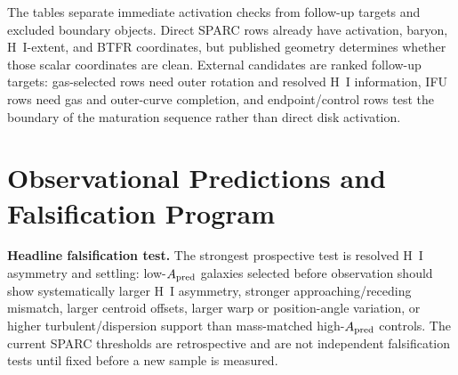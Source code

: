 \documentclass[11pt]{article}
\begin{document}
\begin{table}[H]
\centering
\scriptsize
\caption{Top low-activation follow-up candidates and juvenile-forming contrasts.}
\end{table}

The tables separate immediate activation checks from follow-up targets and excluded boundary objects. Direct SPARC rows already have activation, baryon, H~I-extent, and BTFR coordinates, but published geometry determines whether those scalar coordinates are clean. External candidates are ranked follow-up targets: gas-selected rows need outer rotation and resolved H~I information, IFU rows need gas and outer-curve completion, and endpoint/control rows test the boundary of the maturation sequence rather than direct disk activation.

\section{Observational Predictions and Falsification Program}

\textbf{Headline falsification test.} The strongest prospective test is resolved H~I asymmetry and settling: low-$A_{\rm pred}$ galaxies selected before observation should show systematically larger H~I asymmetry, stronger approaching/receding mismatch, larger centroid offsets, larger warp or position-angle variation, or higher turbulent/dispersion support than mass-matched high-$A_{\rm pred}$ controls. The current SPARC thresholds are retrospective and are not independent falsification tests until fixed before a new sample is measured.
\end{document}
